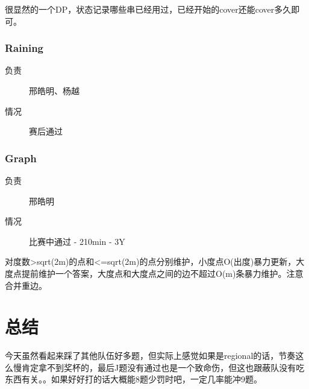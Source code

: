 \documentclass[a4paper, 11pt, nofonts, nocap, fancyhdr]{ctexart}
\newcommand{\problem}[1]{\subsubsection{#1}}
\begin{document}
很显然的一个DP，状态记录哪些串已经用过，已经开始的cover还能cover多久即可。

\problem{Raining}

\begin{description}
\item[负责] 邢皓明、杨越
\item[情况] 赛后通过
\end{description}



\problem{Graph}

\begin{description}
\item[负责] 邢皓明
\item[情况] 比赛中通过 - 210min - 3Y
\end{description}

对度数>sqrt(2m)的点和<=sqrt(2m)的点分别维护，小度点O(出度)暴力更新，大度点提前维护一个答案，大度点和大度点之间的边不超过O(m)条暴力维护。注意合并重边。

\section{总结}

今天虽然看起来踩了其他队伍好多题，但实际上感觉如果是regional的话，节奏这么慢肯定拿不到奖杯的，最后J题没有通过也是一个致命伤，但这也跟蔽队没有吃东西有关。。如果好好打的话大概能8题少罚时吧，一定几率能冲9题。
\end{document}

